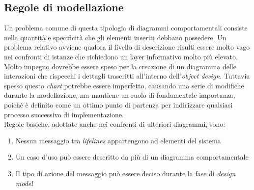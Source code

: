 \documentclass{article}
\begin{document}
\subsection*{Regole di modellazione}
\large
Un problema comune di questa tipologia di diagrammi comportamentali consiste nella quantità e specificità che gli elementi inseriti debbano possedere. Un problema relativo avviene qualora il livello di descrizione risulti essere molto vago nei confronti di istanze che richiedono un layer informativo molto più elevato.\\
Molto impegno dovrebbe essere speso per la creazione di un diagramma delle interazioni che rispecchi i dettagli trascritti all'interno dell'\textit{object design}. Tuttavia spesso questo \textit{chart} potrebbe essere imperfetto, causando una serie di modifiche durante la modellazione, ma mantiene un ruolo di fondamentale importanza, poichè è definito come un ottimo punto di partenza per indirizzare qualsiasi processo successivo di implementazione.\vspace*{14pt}\\
Regole basiche, adottate anche nei confronti di ulteriori diagrammi, sono:
\begin{enumerate}
    \renewcommand{\labelenumi}{-}
    \item Nessun messaggio tra \textit{lifelines} appartengono ad elementi del sistema
    \item Un caso d'uso può essere descritto da più di un diagramma comportamentale
    \item Il tipo di azione del messaggio può essere deciso durante la fase di \textit{design model}
\end{enumerate}
\end{document}
